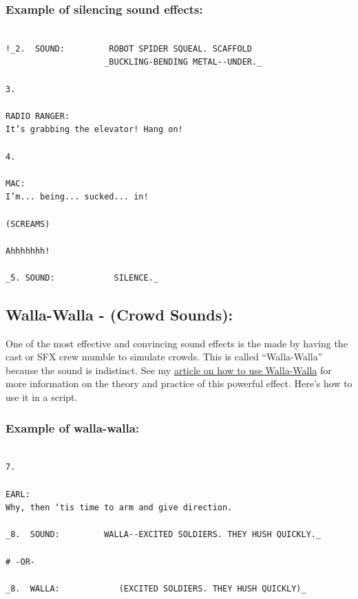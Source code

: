 \documentclass[openleft,oneside,showtrims]{memoir}
\begin{document}
\subsubsection*{Example of silencing sound effects:}
\label{sec:org73cccc3}

\lstset{language=fountain,label= ,caption= ,captionpos=b,numbers=none}
\begin{lstlisting}

!_2.  SOUND:         ROBOT SPIDER SQUEAL. SCAFFOLD
                    _BUCKLING-BENDING METAL--UNDER._

3.

RADIO RANGER:
It’s grabbing the elevator! Hang on!

4.

MAC:
I’m... being... sucked... in!
  
(SCREAMS)
  
Ahhhhhhh!

_5. SOUND:            SILENCE._

\end{lstlisting}
\subsection{Walla-Walla - (Crowd Sounds):}
\label{sec:org5c255a9}
One of the most effective and convincing sound effects is the made by having the cast or SFX crew mumble to simulate crowds. This is called ``Walla-Walla'' because the sound is indistinct. See my \href{https://www.ruyasonic.com/sfx\_walla.htm}{article on how to use Walla-Walla} for more information on the theory and practice of this powerful effect. Here's how to use it in a script.

\subsubsection*{Example of walla-walla:}
\label{sec:orga0985c8}

\lstset{language=fountain,label= ,caption= ,captionpos=b,numbers=none}
\begin{lstlisting}

7.

EARL:
Why, then ‘tis time to arm and give direction.

_8.  SOUND:         WALLA--EXCITED SOLDIERS. THEY HUSH QUICKLY._

# -OR-

_8.  WALLA:            (EXCITED SOLDIERS. THEY HUSH QUICKLY)_

\end{lstlisting}
\end{document}

